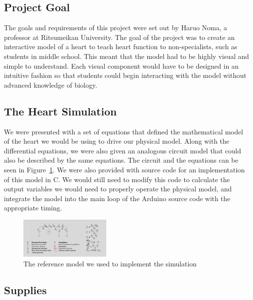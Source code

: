 \documentclass[a4paper, 10pt, american, titlepage]{article}
\begin{document}
\subsection{Project Goal}
\label{sec:projectGoal}

The goals and requirements of this project were set out by Haruo Noma, a
professor at Ritsumeikan University. The goal of the project was to create an
interactive model of a heart to teach heart function to non-specialists, such as
students in middle school. This meant that the model had to be highly visual and
simple to understand. Each visual component would have to be designed in an
intuitive fashion so that students could begin interacting with the model
without advanced knowledge of biology.

\subsection{The Heart Simulation}
\label{sec:theHeartSimulation}

We were presented with a set of equations that defined the mathematical model of
the heart we would be using to drive our physical model. Along with the
differential equations, we were also given an analogous circuit model that could
also be described by the same equations. The circuit and the equations can be
seen in Figure~\ref{fig:referenceModel}. We were also provided with source code
for an implementation of this model in C. We would still need to modify this
code to calculate the output variables we would need to properly operate the
physical model, and integrate the model into the main loop of the Arduino source
code with the appropriate timing.

\begin{figure}[h] \centering
    \includegraphics[width=0.4\textwidth]{reference-model.png}
    \caption{The reference model we used to implement the simulation}
    \label{fig:referenceModel}
\end{figure}

\subsection{Supplies}
\label{sec:supplies}
\end{document}

